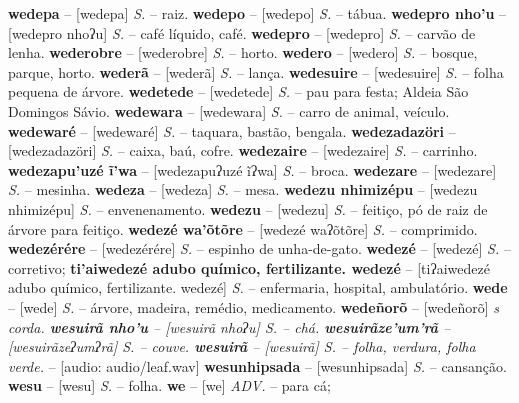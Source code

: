 \textbf{wedepa} -- [wedepa] \textit{S.} -- raiz.
\textbf{wedepo} -- [wedepo] \textit{S.} -- tábua.
\textbf{wedepro nho'u} -- [wedepro nhoʔu] \textit{S.} -- café líquido, café.
\textbf{wedepro} -- [wedepro] \textit{S.} -- carvão de lenha.
\textbf{wederobre} -- [wederobre] \textit{S.} -- horto.
\textbf{wedero} -- [wedero] \textit{S.} -- bosque, parque, horto.
\textbf{wederã} -- [wederã] \textit{S.} -- lança.
\textbf{wedesuire} -- [wedesuire] \textit{S.} -- folha pequena de árvore.
\textbf{wedetede} -- [wedetede] \textit{S.} -- pau para festa; Aldeia São Domingos Sávio.
\textbf{wedewara} -- [wedewara] \textit{S.} -- carro de animal, veículo.
\textbf{wedewaré} -- [wedewaré] \textit{S.} -- taquara, bastão, bengala.
\textbf{wedezadazöri} -- [wedezadazöri] \textit{S.} -- caixa, baú, cofre.
\textbf{wedezaire} -- [wedezaire] \textit{S.} -- carrinho.
\textbf{wedezapu'uzé ĩ'wa} -- [wedezapuʔuzé ĩʔwa] \textit{S.} -- broca.
\textbf{wedezare} -- [wedezare] \textit{S.} -- mesinha.
\textbf{wedeza} -- [wedeza] \textit{S.} -- mesa.
\textbf{wedezu nhimizépu} -- [wedezu nhimizépu] \textit{S.} -- envenenamento.
\textbf{wedezu} -- [wedezu] \textit{S.} -- feitiço, pó de raiz de árvore para feitiço.
\textbf{wedezé wa'õtõre} -- [wedezé waʔõtõre] \textit{S.} -- comprimido.
\textbf{wedezérére} -- [wedezérére] \textit{S.} -- espinho de unha-de-gato.
\textbf{wedezé} -- [wedezé] \textit{S.} -- corretivo;
\textbf{ti'aiwedezé adubo químico, fertilizante. wedezé} -- [tiʔaiwedezé adubo químico, fertilizante. wedezé] \textit{S.} -- enfermaria, hospital, ambulatório.
\textbf{wede} -- [wede] \textit{S.} -- árvore, madeira, remédio, medicamento.
\textbf{wedeñorõ} -- [wedeñorõ] \textit{s corda.
\textbf{wesuirã nho'u} -- [wesuirã nhoʔu] \textit{S.} -- chá.
\textbf{wesuirãze'um'rã} -- [wesuirãzeʔumʔrã] \textit{S.} -- couve.
\textbf{wesuirã} -- [wesuirã] \textit{S.} -- folha, verdura, folha verde.} -- [audio: audio/leaf.wav]
\textbf{wesunhipsada} -- [wesunhipsada] \textit{S.} -- cansanção.
\textbf{wesu} -- [wesu] \textit{S.} -- folha.
\textbf{we} -- [we] \textit{ADV.} -- para cá;
